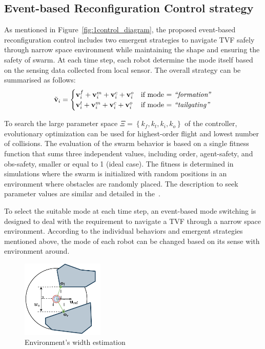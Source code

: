 \subsection{Event-based Reconfiguration Control strategy}\label{sec:erc}

As mentioned in Figure~\ref{fig:1control_diagram}, the proposed event-based reconfiguration control includes two emergent strategies to navigate TVF safely through narrow space environment while maintaining the shape and ensuring the safety of swarm. At each time step, each robot determine the mode itself based on the sensing data collected from local sensor. The overall strategy can be summarised as follows:
\begin{equation}
    \tilde{\mathbf{v}}_i=\begin{cases}
        \mathbf{v}_i^f+\mathbf{v}_i^m+\mathbf{v}_i^c+\mathbf{v}_i^o & \text{if mode = \textit{``formation''}}\\
        \mathbf{v}_i^t+\mathbf{v}_i^m+\mathbf{v}_i^c+\mathbf{v}_i^o & \text{if mode = \textit{``tailgating''}}
    \end{cases}
    \label{eqn:1v}
\end{equation}

To search the large parameter space $\Xi=\left\{k_f,k_t,k_i,k_o\right\}$ of the controller, evolutionary optimization can be used for highest-order flight and lowest number of collisions. The evaluation of the swarm behavior is based on a single fitness function that sums three independent values, including order, agent-safety, and obs-safety, smaller or equal to 1 (ideal case). The fitness is determined in simulations where the swarm is initialized with random positions in an environment where obstacles are  randomly placed. The description  to seek parameter values are similar and detailed in the~\cite{Vsrhelyi2018}.

To select the suitable mode at each time step, an event-based mode switching is designed to deal with the requirement to navigate a TVF through a narrow space environment. According to the individual behaviors and emergent strategies mentioned above, the mode of each robot can be changed based on its sense with environment around.

\begin{figure}
    \centering
    \includegraphics[width=0.35\textwidth]{paper2/images/we.pdf}
    \caption{Environment's width estimation}
    \label{fig:1we}
\end{figure}

